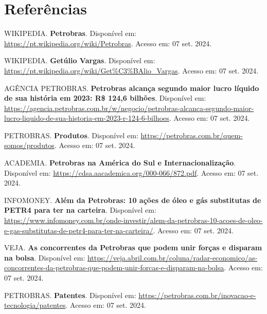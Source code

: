 \newpage
{} %

\section{Referências}

\vspace{0.5cm} %

\noindent WIKIPEDIA. \textbf{Petrobras}. Disponível em: \url{https://pt.wikipedia.org/wiki/Petrobras}. Acesso em: 07 set. 2024.

\noindent WIKIPEDIA. \textbf{Getúlio Vargas}. Disponível em: \url{https://pt.wikipedia.org/wiki/Get\%C3\%BAlio_Vargas}. Acesso em: 07 set. 2024.

\noindent AGÊNCIA PETROBRAS. \textbf{Petrobras alcança segundo maior lucro líquido de sua história em 2023: R\$ 124,6 bilhões}. Disponível em: \url{https://agencia.petrobras.com.br/w/negocio/petrobras-alcanca-segundo-maior-lucro-liquido-de-sua-historia-em-2023-r-124-6-bilhoes}. Acesso em: 07 set. 2024.

\noindent PETROBRAS. \textbf{Produtos}. Disponível em: \url{https://petrobras.com.br/quem-somos/produtos}. Acesso em: 07 set. 2024.

\noindent ACADEMIA. \textbf{Petrobras na América do Sul e Internacionalização}. Disponível em: \url{https://cdsa.aacademica.org/000-066/872.pdf}. Acesso em: 07 set. 2024.

\noindent INFOMONEY. \textbf{Além da Petrobras: 10 ações de óleo e gás substitutas de PETR4 para ter na carteira}. Disponível em: \url{https://www.infomoney.com.br/onde-investir/alem-da-petrobras-10-acoes-de-oleo-e-gas-substitutas-de-petr4-para-ter-na-carteira/}. Acesso em: 07 set. 2024.

\noindent VEJA. \textbf{As concorrentes da Petrobras que podem unir forças e disparam na bolsa}. Disponível em: \url{https://veja.abril.com.br/coluna/radar-economico/as-concorrentes-da-petrobras-que-podem-unir-forcas-e-disparam-na-bolsa}. Acesso em: 07 set. 2024.

\noindent PETROBRAS. \textbf{Patentes}. Disponível em: \url{https://petrobras.com.br/inovacao-e-tecnologia/patentes}. Acesso em: 07 set. 2024.

